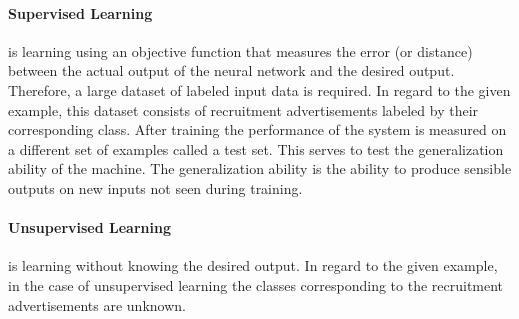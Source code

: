 		\paragraph{Supervised Learning}
		is learning using an objective function that measures the error (or distance) between the actual output of the neural network and the desired output. Therefore, a large dataset of labeled input data is required. In regard to the given example, this dataset consists of recruitment advertisements labeled by their corresponding class. After training the performance of the system is measured on a different set of examples called a test set. This serves to test the generalization ability of the machine. The generalization ability is the ability to produce sensible outputs on new inputs not seen during training. \autocite{LeCun.2015}
		\paragraph{Unsupervised Learning}
		is learning without knowing the desired output. \autocite{Ghahramani.2004} In regard to the given example, in the case of unsupervised learning the classes corresponding to the recruitment advertisements are unknown.
		
